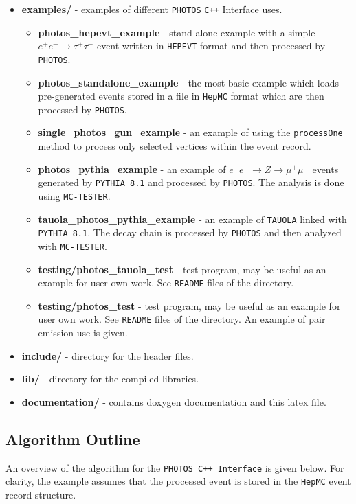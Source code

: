 \documentclass[]{Photos_interface_design}
\begin{document}
\begin{itemize}
  \item {\bf examples/ } - examples of different {\tt PHOTOS} {\tt C++} Interface uses.
    \begin{itemize}
        \item {\bf photos\_hepevt\_example} - stand alone example with a simple 
        $e^+e^- \rightarrow \tau^+\tau^-$ event written in {\tt HEPEVT} format
         and then processed by {\tt PHOTOS}.
	\item {\bf photos\_standalone\_example} - the most basic example which loads pre-generated 
	      events stored in a file in {\tt HepMC} format which are then processed by {\tt PHOTOS}.
	\item {\bf single\_photos\_gun\_example} - an example of using the {\tt processOne} method
	      to process only selected vertices within the event record.
    \item {\bf photos\_pythia\_example} - an example of $e^+e^- \rightarrow Z \rightarrow \mu^+\mu^-$ events
	generated by {\tt PYTHIA 8.1} and processed by {\tt PHOTOS}. The analysis is done using {\tt MC-TESTER}.
    \item {\bf tauola\_photos\_pythia\_example } - an example of  {\tt TAUOLA} linked with {\tt PYTHIA 8.1}.
	The decay chain is processed by {\tt PHOTOS} and then analyzed with {\tt MC-TESTER}.
\item {\bf testing/photos\_tauola\_test} - test program, may be useful as an example for user own work. See {\tt README} files of the directory. 
\item {\bf testing/photos\_test} - test program, may be useful as an example for user own work. See {\tt README} files of the directory. An example of pair emission use is given.
    \end{itemize}   
  \item {\bf include/} - directory for the header files.
  \item {\bf lib/ } - directory for the compiled  libraries. 
  \item {\bf documentation/ } - contains doxygen documentation and this latex file.
\end{itemize}

\subsection{Algorithm Outline}
\label{sect:Outline}

An overview of the algorithm for  the {\tt PHOTOS C++ Interface} is
given below. For clarity, the example assumes that the processed event
is stored in the {\tt HepMC} event record structure.
\end{document}
